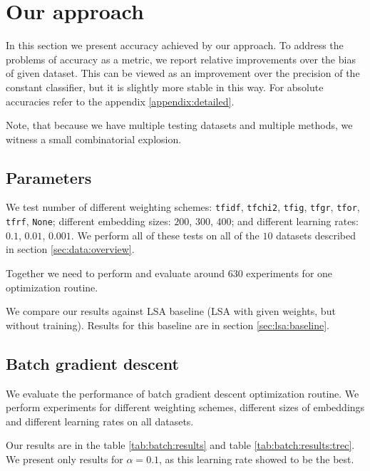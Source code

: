 \section{Our approach}
    
    In this section we present accuracy achieved by our approach.
    To address the problems of accuracy as a metric, we report relative improvements over the bias of given dataset.
    This can be viewed as an improvement over the precision of the constant classifier, but it is slightly more stable in this way. 
    For absolute accuracies refer to the appendix \ref{appendix:detailed}. 

    Note, that because we have multiple testing datasets and multiple methods, we witness a small combinatorial explosion.

    \subsection{Parameters}
    \* %
    We test number of different weighting schemes: \texttt{tfidf}, \texttt{tfchi2}, \texttt{tfig}, \texttt{tfgr}, \texttt{tfor}, \texttt{tfrf}, \texttt{None};
    different embedding sizes: $200$, $300$, $400$;
    and different learning rates: $0.1$, $0.01$, $0.001$.
    We perform all of these tests on all of the $10$ datasets described in section \ref{sec:data:overview}.
    
    Together we need to perform and evaluate around $630$ experiments for one optimization routine.
    
    We compare our results against LSA baseline (LSA with given weights, but without training).
    Results for this baseline are in section \ref{sec:lsa:baseline}.
    
    \subsection{Batch gradient descent}
    We evaluate the performance of batch gradient descent optimization routine.
    We perform experiments for different weighting schemes, different sizes of embeddings and different learning rates on all datasets.

    Our results are in the table \ref{tab:batch:results} and table \ref{tab:batch:results:trec}.
    We present only results for $\alpha=0.1$, as this learning rate showed to be the best. \* %
        
    

